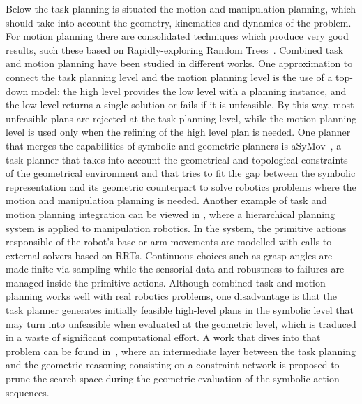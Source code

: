 \documentclass[twocolumn]{svjour3}          %
\begin{document}
Below the task planning is situated the motion and manipulation planning, which should take into account the geometry, kinematics and dynamics of the problem. For motion planning there are consolidated techniques which produce very good results, such these based on Rapidly-exploring Random Trees~\cite{LaValle04}. Combined task and motion planning have been studied in different works. One approximation to connect the task planning level and the motion planning level is the use of a top-down model: the high level provides the low level with a planning instance, and the low level returns a single solution or fails if it is unfeasible. By this way, most unfeasible plans are rejected at the task planning level, while the motion planning level is used only when the refining of the high level plan is needed. One planner that merges the capabilities of symbolic and geometric planners is aSyMov~\cite{Cambon01012009}, a task planner that takes into account the geometrical and topological constraints of the geometrical environment and that tries to fit the gap between the symbolic representation and its geometric counterpart to solve robotics problems where the motion and manipulation planning is needed. Another example of task and motion planning integration can be viewed in \cite{Wolfe}, where a hierarchical planning system is applied to manipulation robotics. In the system, the primitive actions responsible of the robot's base or arm movements are modelled with calls to external solvers based on RRTs. Continuous choices such as grasp angles are made finite via sampling while the sensorial data and robustness to failures are managed inside the primitive actions. Although combined task and motion planning works well with real robotics problems, one disadvantage is that the task planner generates initially feasible high-level plans in the symbolic level that may turn into unfeasible when evaluated at the geometric level, which is traduced in a waste of significant computational effort. A work that dives into that problem can be found in~\cite{Lagriffoul01122014}, where an intermediate layer between the task planning and the geometric reasoning consisting on a constraint network is proposed to prune the search space during the geometric evaluation of the symbolic action sequences.
\end{document}
